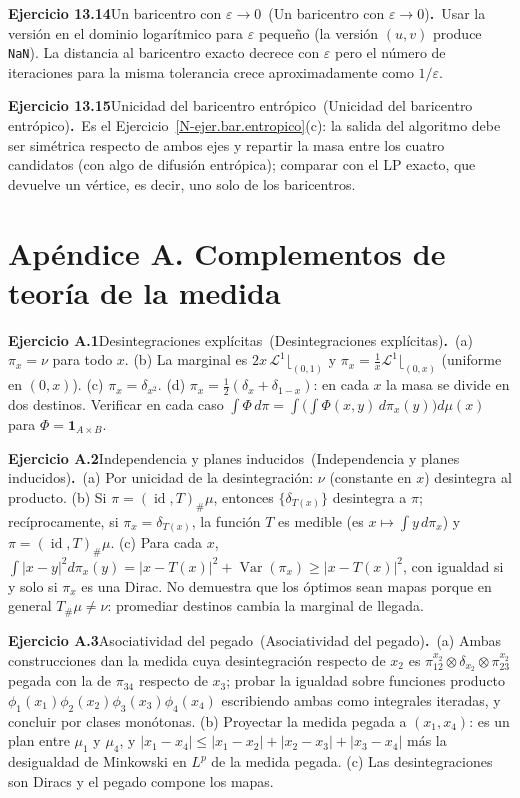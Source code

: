 \documentclass[11pt,a4paper]{amsart}
\newcommand{\id}{\operatorname{id}}
\newcommand{\ve}{\varepsilon}
\newcommand{\LL}{{\mathcal L}}
\newcommand{\I}{{\mathbf 1}}
\theoremstyle{remark}
\theoremstyle{definition}
\numberwithin{subsection}{section}
\numberwithin{equation}{section}
\newcommand{\ejlabel}[2]{\par\medskip\noindent\textbf{Ejercicio #1}\ifx\relax#2\relax\else\ (#2)\fi\textbf{.}\ }
\begin{document}
\ejlabel{13.14}{Un baricentro con $\ve\to0$}Usar la versión en el dominio logarítmico para $\ve$ pequeño (la versión $(u,v)$ produce \texttt{NaN}). La distancia al baricentro exacto decrece con $\ve$ pero el número de iteraciones para la misma tolerancia crece aproximadamente como $1/\ve$.

\ejlabel{13.15}{Unicidad del baricentro entrópico}Es el Ejercicio~\ref{N-ejer.bar.entropico}(c): la salida del algoritmo debe ser simétrica respecto de ambos ejes y repartir la masa entre los cuatro candidatos (con algo de difusión entrópica); comparar con el LP exacto, que devuelve un vértice, es decir, uno solo de los baricentros.

\section*{Apéndice A. Complementos de teoría de la medida}
\ejlabel{A.1}{Desintegraciones explícitas}(a) $\pi_x=\nu$ para todo $x$. (b) La marginal es $2x\,\LL^1\lfloor_{(0,1)}$ y $\pi_x=\frac1x\LL^1\lfloor_{(0,x)}$ (uniforme en $(0,x)$). (c) $\pi_x=\delta_{x^2}$. (d) $\pi_x=\frac12(\delta_x+\delta_{1-x})$: en cada $x$ la masa se divide en dos destinos. Verificar en cada caso $\int\Phi\,d\pi=\int\bigl(\int\Phi(x,y)\,d\pi_x(y)\bigr)d\mu(x)$ para $\Phi=\I_{A\times B}$.

\ejlabel{A.2}{Independencia y planes inducidos}(a) Por unicidad de la desintegración: $\nu$ (constante en $x$) desintegra al producto. (b) Si $\pi=(\id,T)_\#\mu$, entonces $\{\delta_{T(x)}\}$ desintegra a $\pi$; recíprocamente, si $\pi_x=\delta_{T(x)}$, la función $T$ es medible (es $x\mapsto\int y\,d\pi_x$) y $\pi=(\id,T)_\#\mu$. (c) Para cada $x$, $\int|x-y|^2d\pi_x(y)=|x-T(x)|^2+\operatorname{Var}(\pi_x)\ge|x-T(x)|^2$, con igualdad si y solo si $\pi_x$ es una Dirac. No demuestra que los óptimos sean mapas porque en general $T_\#\mu\ne\nu$: promediar destinos cambia la marginal de llegada.

\ejlabel{A.3}{Asociatividad del pegado}(a) Ambas construcciones dan la medida cuya desintegración respecto de $x_2$ es $\pi_{12}^{x_2}\otimes\delta_{x_2}\otimes\pi_{23}^{x_2}$ pegada con la de $\pi_{34}$ respecto de $x_3$; probar la igualdad sobre funciones producto $\phi_1(x_1)\phi_2(x_2)\phi_3(x_3)\phi_4(x_4)$ escribiendo ambas como integrales iteradas, y concluir por clases monótonas. (b) Proyectar la medida pegada a $(x_1,x_4)$: es un plan entre $\mu_1$ y $\mu_4$, y $|x_1-x_4|\le|x_1-x_2|+|x_2-x_3|+|x_3-x_4|$ más la desigualdad de Minkowski en $L^p$ de la medida pegada. (c) Las desintegraciones son Diracs y el pegado compone los mapas.
\end{document}
